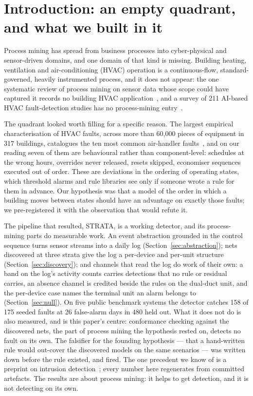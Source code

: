 \documentclass[runningheads]{llncs}
\begin{document}
\section{Introduction: an empty quadrant, and what we built in it}
\label{sec:intro}

Process mining has spread from business processes into cyber-physical and sensor-driven domains, and one domain of that kind is missing. Building heating, ventilation and air-conditioning (HVAC) operation is a continuous-flow, standard-governed, heavily instrumented process, and it does not appear: the one systematic review of process mining on sensor data whose scope could have captured it records no building HVAC application~\cite{brzychczy2025pmsensorreview}, and a survey of 211 AI-based HVAC fault-detection studies has no process-mining entry~\cite{bi2024aihvacreview}.

The quadrant looked worth filling for a specific reason. The largest empirical characterisation of HVAC faults, across more than 60{,}000 pieces of equipment in 317 buildings, catalogues the ten most common air-handler faults~\cite{crowe2023faultprevalence}, and on our reading seven of them are behavioural rather than component-level: schedules at the wrong hours, overrides never released, resets skipped, economiser sequences executed out of order. These are deviations in the ordering of operating states, which threshold alarms and rule libraries see only if someone wrote a rule for them in advance. Our hypothesis was that a model of the order in which a building moves between states should have an advantage on exactly those faults; we pre-registered it with the observation that would refute it.

The pipeline that resulted, STRATA, is a working detector, and its process-mining parts do measurable work. An event abstraction grounded in the control sequence turns sensor streams into a daily log (Section~\ref{sec:abstraction}); nets discovered at three strata give the log a per-device and per-unit structure (Section~\ref{sec:discovery}); and channels that read the log do work of their own: a band on the log's activity counts carries detections that no rule or residual carries, an absence channel is credited beside the rules on the dual-duct unit, and the per-device case names the terminal unit an alarm belongs to (Section~\ref{sec:null}). On five public benchmark systems the detector catches 158 of 175 seeded faults at 26 false-alarm days in 480 held out. What it does not do is also measured, and is this paper's centre: conformance checking against the discovered nets, the part of process mining the hypothesis rested on, detects no fault on its own. The falsifier for the founding hypothesis --- that a hand-written rule would out-cover the discovered models on the same scenarios --- was written down before the rule existed, and fired. The one precedent we know of is a preprint on intrusion detection~\cite{zhong2022pmids}; every number here regenerates from committed artefacts. The results are about process mining: it helps to get detection, and it is not detecting on its own.
\end{document}
